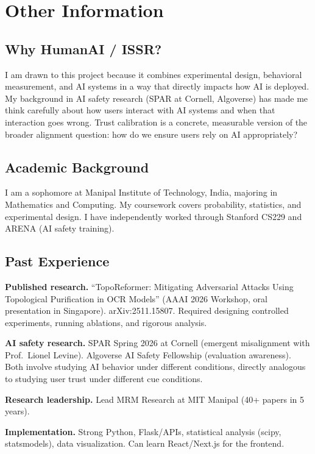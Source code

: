 \documentclass[12pt]{article}
\begin{document}
\section{Other Information}

\subsection{Why HumanAI / ISSR?}

I am drawn to this project because it combines experimental design, behavioral measurement, and AI systems in a way that directly impacts how AI is deployed. My background in AI safety research (SPAR at Cornell, Algoverse) has made me think carefully about how users interact with AI systems and when that interaction goes wrong. Trust calibration is a concrete, measurable version of the broader alignment question: how do we ensure users rely on AI appropriately?

\subsection{Academic Background}

I am a sophomore at Manipal Institute of Technology, India, majoring in Mathematics and Computing. My coursework covers probability, statistics, and experimental design. I have independently worked through Stanford CS229 and ARENA (AI safety training).

\subsection{Past Experience}

\textbf{Published research.} ``TopoReformer: Mitigating Adversarial Attacks Using Topological Purification in OCR Models'' (AAAI 2026 Workshop, oral presentation in Singapore). arXiv:2511.15807. Required designing controlled experiments, running ablations, and rigorous analysis.

\textbf{AI safety research.} SPAR Spring 2026 at Cornell (emergent misalignment with Prof.\ Lionel Levine). Algoverse AI Safety Fellowship (evaluation awareness). Both involve studying AI behavior under different conditions, directly analogous to studying user trust under different cue conditions.

\textbf{Research leadership.} Lead MRM Research at MIT Manipal (40+ papers in 5 years).

\textbf{Implementation.} Strong Python, Flask/APIs, statistical analysis (scipy, statsmodels), data visualization. Can learn React/Next.js for the frontend.
\end{document}
